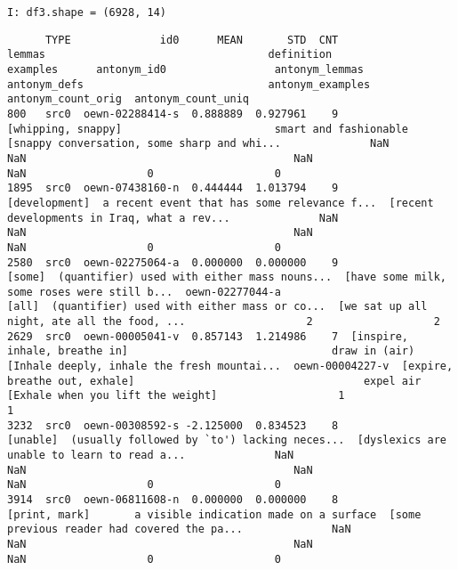 \documentclass[a4paper,10pt,onecolumn,oneside,openright]{article}
\begin{document}
\begin{verbatim}
I: df3.shape = (6928, 14)
\end{verbatim}

\begin{verbatim}
      TYPE              id0      MEAN       STD  CNT                         lemmas                                   definition                                     examples      antonym_id0                 antonym_lemmas                                 antonym_defs                             antonym_examples  antonym_count_orig  antonym_count_uniq
800   src0  oewn-02288414-s  0.888889  0.927961    9             [whipping, snappy]                        smart and fashionable  [snappy conversation, some sharp and whi...              NaN                            NaN                                          NaN                                          NaN                   0                   0
1895  src0  oewn-07438160-n  0.444444  1.013794    9                  [development]  a recent event that has some relevance f...  [recent developments in Iraq, what a rev...              NaN                            NaN                                          NaN                                          NaN                   0                   0
2580  src0  oewn-02275064-a  0.000000  0.000000    9                         [some]  (quantifier) used with either mass nouns...  [have some milk, some roses were still b...  oewn-02277044-a                          [all]  (quantifier) used with either mass or co...  [we sat up all night, ate all the food, ...                   2                   2
2629  src0  oewn-00005041-v  0.857143  1.214986    7  [inspire, inhale, breathe in]                                draw in (air)  [Inhale deeply, inhale the fresh mountai...  oewn-00004227-v  [expire, breathe out, exhale]                                    expel air            [Exhale when you lift the weight]                   1                   1
3232  src0  oewn-00308592-s -2.125000  0.834523    8                       [unable]  (usually followed by `to') lacking neces...  [dyslexics are unable to learn to read a...              NaN                            NaN                                          NaN                                          NaN                   0                   0
3914  src0  oewn-06811608-n  0.000000  0.000000    8                  [print, mark]       a visible indication made on a surface  [some previous reader had covered the pa...              NaN                            NaN                                          NaN                                          NaN                   0                   0

\end{verbatim}
\end{document}

